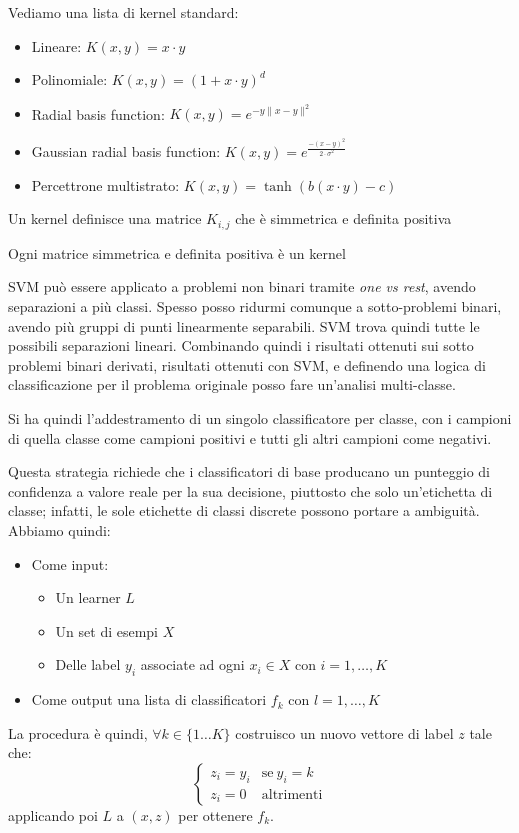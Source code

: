 Vediamo una lista di kernel standard:
\begin{itemize}
    \item Lineare: $K(x, y) = x \cdot y$
    \item Polinomiale: $K(x, y) = (1 + x \cdot y)^d$
    \item Radial basis function: $K(x, y) = e^{-y \| x - y\|^2}$
    \item Gaussian radial basis function: $K(x, y) = e^{\frac{-(x-y)^2}{2 \cdot \sigma^2}}$
    \item Percettrone multistrato: $K(x, y) = \tanh(b(x \cdot y) - c)$
\end{itemize}
\begin{teorema}
    Un kernel definisce una matrice $K_{i,j}$ che è simmetrica e definita positiva
\end{teorema}
\begin{teorema}
    Ogni matrice simmetrica e definita positiva è un kernel
\end{teorema}

SVM può essere applicato a problemi non binari tramite \textit{one vs rest}, avendo separazioni a più classi. Spesso posso ridurmi comunque a sotto-problemi binari, avendo più gruppi di punti linearmente separabili. SVM trova quindi tutte le possibili separazioni lineari. Combinando quindi i risultati ottenuti sui sotto problemi binari derivati, risultati ottenuti con SVM, e definendo una logica di classificazione per il problema originale posso fare un'analisi multi-classe.

Si ha quindi l'addestramento di un singolo classificatore per classe, con i campioni di quella classe come campioni positivi e tutti gli altri campioni come negativi.

Questa strategia richiede che i classificatori di base producano un punteggio di confidenza a valore reale per la sua decisione, piuttosto che solo un'etichetta di classe; infatti, le sole etichette di classi discrete possono portare a ambiguità. Abbiamo quindi:
\begin{itemize}
    \item Come input:
    \begin{itemize}
        \item Un learner $L$
        \item Un set di esempi $X$
        \item Delle label $y_i$ associate ad ogni $x_i \in X$ con $i = 1, \dots, K$
    \end{itemize}
    \item Come output una lista di classificatori $f_k$ con $l = 1,\dots, K$
\end{itemize}
La procedura è quindi, $\forall k \in \{1 \dots K\}$ costruisco un nuovo vettore di label $z$ tale che:
\begin{equation}
    \begin{cases}
        z_i = y_i & \text{se} \ y_i = k \\
        z_i = 0 & \text{altrimenti}
    \end{cases}
\end{equation}
applicando poi $L$ a $(x, z)$ per ottenere $f_k$.

